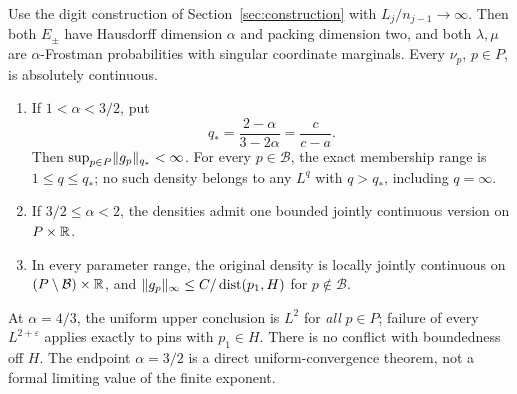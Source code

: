 \begin{theorem}\label{thm:main-super}
Use the digit construction of Section~\ref{sec:construction} with
$L_j/n_{j-1}\to\infty$. Then both $E_\pm$ have Hausdorff dimension
$\alpha$ and packing dimension two, and both $\lambda,\mu$ are
$\alpha$-Frostman probabilities with singular coordinate marginals.
Every $\nu_p$, $p\in P$, is absolutely continuous.
\begin{enumerate}[label=(\roman*),leftmargin=*]
\item If $1<\alpha<3/2$, put
\begin{equation}\label{eq:qstar}
 q_* = \frac{2-\alpha}{3-2\alpha}=\frac{c}{c-a}.
\end{equation}
Then $\sup_{p\in P}\lVert g_p\rVert_{q_*}<\infty$. For every
$p\in\mathcal B$, the exact membership range is $1\leq q\leq q_*$;
no such density belongs to any $L^q$ with $q>q_*$, including $q=\infty$.
\item If $3/2\leq\alpha<2$, the densities admit one bounded jointly
continuous version on $P\times\mathbb R$.
\item In every parameter range, the original density is locally jointly
continuous on $(P\setminus\mathcal B)\times\mathbb R$, and
$\lVert g_p\rVert_\infty\leq C/\operatorname{dist}(p_1,H)$ for $p\notin\mathcal B$.
\end{enumerate}
\end{theorem}
At $\alpha=4/3$, the uniform upper conclusion is $L^2$ for \emph{all}
$p\in P$; failure of every $L^{2+\varepsilon}$ applies exactly to pins
with $p_1\in H$. There is no conflict with boundedness off $H$.
The endpoint $\alpha=3/2$ is a direct uniform-convergence theorem,
not a formal limiting value of the finite exponent.

